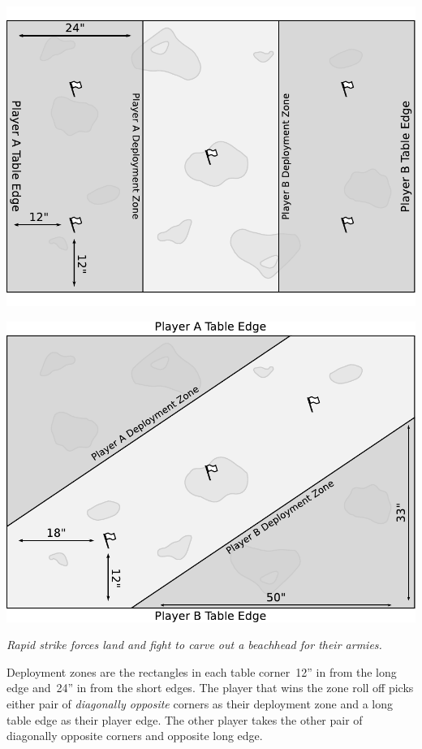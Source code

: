 \documentclass{40k}
\begin{document}
\bigskip\centerline{\includegraphics[scale=0.6]{maps/mission2}}


\bigskip\centerline{\includegraphics[scale=0.6]{maps/mission3}}

\clearpage
{}

\centerline{\emph{Rapid strike forces land and fight to carve out a
    beachhead for their armies.}}


Deployment zones are the rectangles in each table corner~12'' in from
the long edge and~24'' in from the short edges.  The player that wins
the zone roll off picks either pair of \emph{diagonally opposite}
corners as their deployment zone and a long table edge as their player
edge.  The other player takes the other pair of diagonally opposite
corners and opposite long edge.
\end{document}
